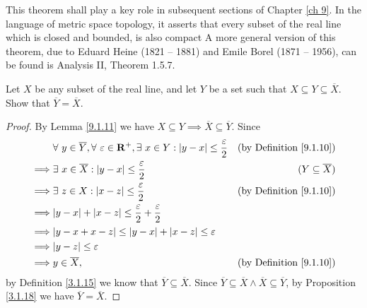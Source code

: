 \begin{remark}\label{9.1.25}
    This theorem shall play a key role in subsequent sections of Chapter \ref{ch 9}.
    In the language of metric space topology, it asserts that every subset of the real line which is closed and bounded, is also compact
    A more general version of this theorem, due to Eduard Heine (1821 -- 1881) and Emile Borel (1871 -- 1956), can be found is Analysis II, Theorem 1.5.7.
\end{remark}

\exercisesection

\begin{exercise}\label{ex 9.1.1}
    Let \(X\) be any subset of the real line, and let \(Y\) be a set such that \(X \subseteq Y \subseteq \overline{X}\).
    Show that \(\overline{Y} = \overline{X}\).
\end{exercise}

\begin{proof}
    By Lemma \ref{9.1.11} we have \(X \subseteq Y \implies \overline{X} \subseteq \overline{Y}\).
    Since
    \begin{align*}
                 & \forall\ y \in \overline{Y}, \forall\ \varepsilon \in \mathbf{R}^+, \exists\ x \in Y : \abs*{y - x} \leq \frac{\varepsilon}{2} & \text{(by Definition \ref{9.1.10})} \\
        \implies & \exists\ x \in \overline{X} : \abs*{y - x} \leq \frac{\varepsilon}{2}                                                          & (Y \subseteq \overline{X})          \\
        \implies & \exists\ z \in X : \abs*{x - z} \leq \frac{\varepsilon}{2}                                                                     & \text{(by Definition \ref{9.1.10})} \\
        \implies & \abs*{y - x} + \abs*{x - z} \leq \frac{\varepsilon}{2} + \frac{\varepsilon}{2}                                                                                       \\
        \implies & \abs*{y - x + x - z} \leq \abs*{y - x} + \abs*{x - z} \leq \varepsilon                                                                                               \\
        \implies & \abs*{y - z} \leq \varepsilon                                                                                                                                        \\
        \implies & y \in \overline{X},                                                                                                            & \text{(by Definition \ref{9.1.10})}
    \end{align*}
    by Definition \ref{3.1.15} we know that \(\overline{Y} \subseteq \overline{X}\).
    Since \(\overline{Y} \subseteq \overline{X} \land \overline{X} \subseteq \overline{Y}\), by Proposition \ref{3.1.18} we have \(\overline{Y} = \overline{X}\).
\end{proof}

